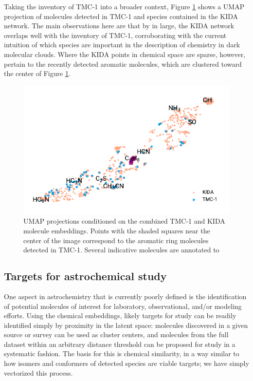 \documentclass[twocolumn]{aastex63}
\begin{document}
Taking the inventory of TMC-1 into a broader context, Figure \ref{fig:kidaviz} shows a UMAP projection of molecules detected in TMC-1 and species contained in the KIDA network. The main observations here are that by in large, the KIDA network overlaps well with the inventory of TMC-1, corroborating with the current intuition of which species are important in the description of chemistry in dark molecular clouds. Where the KIDA points in chemical space are sparse, however, pertain to the recently detected aromatic molecules, which are clustered toward the center of Figure \ref{fig:kidaviz}.

\begin{figure}
    \centering
    \includegraphics[width=\columnwidth]{kida_tmc1_umap.pdf}
    \caption{UMAP projections conditioned on the combined TMC-1 and KIDA molecule embeddings. Points with the shaded squares near the center of the image correspond to the aromatic ring molecules detected in TMC-1. Several indicative molecules are annotated to }
    \label{fig:kidaviz}
\end{figure}

\subsection{Targets for astrochemical study \label{sec:targets}}

One aspect in astrochemistry that is currently poorly defined is the identification of potential molecules of interest for laboratory, observational, and/or modeling efforts. Using the chemical embeddings, likely targets for study can be readily identified simply by proximity in the latent space: molecules discovered in a given source or survey can be used as cluster centers, and molecules from the full dataset within an arbitrary distance threshold can be proposed for study in a systematic fashion. The basis for this is chemical similarity, in a way similar to how isomers and conformers of detected species are viable targets; we have simply vectorized this process.
\end{document}
